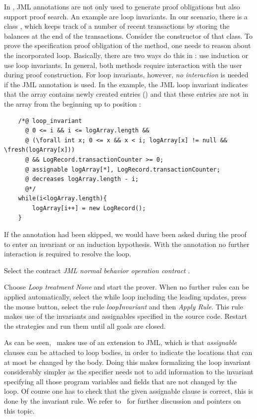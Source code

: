 In \KeY, JML annotations are not only used to generate proof obligations but
also support proof search. An example are loop invariants. In our scenario,
there is a class , which keeps track of a number of recent
transactions by storing the balances at the end of the transactions. Consider
the constructor  of that class.
To prove the  specification proof obligation of the method, one needs to
reason about the incorporated  loop. Basically, there are two
ways do this in \KeY: use induction or use loop invariants. In
general, both methods require interaction with the user during proof
construction. For loop invariants, however, \emph{no interaction} is needed if
the JML  annotation is used.
In the example, the JML loop invariant indicates that the 
array  contains newly created entries () and that 
these entries are not  in the array from the beginning up
to position :
\begin{lstlisting}
 	/*@ loop_invariant
	  @ 0 <= i && i <= logArray.length &&
	  @ (\forall int x; 0 <= x && x < i; logArray[x] != null && \fresh(logArray[x]))
	  @ && LogRecord.transactionCounter >= 0;
	  @ assignable logArray[*], LogRecord.transactionCounter;
	  @ decreases logArray.length - i; 
	  @*/	   
	while(i<logArray.length){ 
	    logArray[i++] = new LogRecord();
	}
\end{lstlisting}

If the annotation had been skipped, we would have been asked during the proof
to enter an invariant or an induction hypothesis. With the annotation no
further interaction is required to resolve the loop.


Select the contract \emph{JML normal
  behavior operation contract} \hspace{0pt}\jn{::}\hspace{0pt}.

Choose \emph{Loop treatment} \emph{None} and start the prover.  
When no further rules can be applied automatically,
select the while loop including the leading updates, press the mouse
button, select the rule \emph{loopInvariant} and then \emph{Apply Rule}. This rule makes use
of the invariants and assignables specified in the source
code. 
Restart the strategies and run them until all goals are closed.

As can be seen, \KeY\ makes use of an extension to JML, which is that
\emph{assignable} clauses can be attached to loop bodies, in order to
indicate the locations that can at most be changed by the body. Doing
this makes formalizing the loop invariant considerably simpler as the
specifier needs not to add information to the invariant specifying all
those program variables and fields that are not changed by the loop.
Of course one has to check that the given assignable clause is
correct, this is done by the invariant rule. We refer
to~\cite{KeYBook2016} for further discussion and pointers on this
topic.

